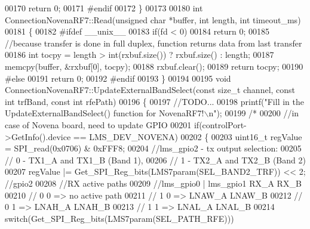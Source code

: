 \begin{DoxyCode}
{{{{00170     \textcolor{keywordflow}{return} 0;
00171 \textcolor{preprocessor}{#endif}
00172 \}
00173 
00180 \textcolor{keywordtype}{int} ConnectionNovenaRF7::Read(\textcolor{keywordtype}{unsigned} \textcolor{keywordtype}{char} *buffer, \textcolor{keywordtype}{int} length, \textcolor{keywordtype}{int} timeout_ms)
00181 \{
00182 \textcolor{preprocessor}{#ifdef \_\_unix\_\_}
00183     \textcolor{keywordflow}{if}(fd < 0)
00184         \textcolor{keywordflow}{return} 0;
00185     \textcolor{comment}{//because transfer is done in full duplex, function returns data from last transfer}
00186     \textcolor{keywordtype}{int} tocpy = length > int(rxbuf.size()) ? rxbuf.size() : length;
00187     memcpy(buffer, &rxbuf[0], tocpy);
00188     rxbuf.clear();
00189     \textcolor{keywordflow}{return} tocpy;
00190 \textcolor{preprocessor}{#else}
00191     \textcolor{keywordflow}{return} 0;
00192 \textcolor{preprocessor}{#endif}
00193 \}
00194 
00195 \textcolor{keywordtype}{void} ConnectionNovenaRF7::UpdateExternalBandSelect(\textcolor{keyword}{const} \textcolor{keywordtype}{size\_t} channel, \textcolor{keyword}{const} \textcolor{keywordtype}{int} trfBand, \textcolor{keyword}{const} \textcolor{keywordtype}{int} 
      rfePath)
00196 \{
00197     \textcolor{comment}{//TODO...}
00198     printf(\textcolor{stringliteral}{"Fill in the UpdateExternalBandSelect() function for NovenaRF7!\(\backslash\)n"});
00199     \textcolor{comment}{/*}
00200 \textcolor{comment}{    //in case of Novena board, need to update GPIO}
00201 \textcolor{comment}{    if(controlPort->GetInfo().device == LMS\_DEV\_NOVENA)}
00202 \textcolor{comment}{    \{}
00203 \textcolor{comment}{        uint16\_t regValue = SPI\_read(0x0706) & 0xFFF8;}
00204 \textcolor{comment}{        //lms\_gpio2 - tx output selection:}
00205 \textcolor{comment}{        //      0 - TX1\_A and TX1\_B (Band 1),}
00206 \textcolor{comment}{        //      1 - TX2\_A and TX2\_B (Band 2)}
00207 \textcolor{comment}{        regValue |= Get\_SPI\_Reg\_bits(LMS7param(SEL\_BAND2\_TRF)) << 2; //gpio2}
00208 \textcolor{comment}{        //RX active paths}
00209 \textcolor{comment}{        //lms\_gpio0 | lms\_gpio1         RX\_A        RX\_B}
00210 \textcolor{comment}{        //  0           0       =>      no active path}
00211 \textcolor{comment}{        //  1           0       =>  LNAW\_A      LNAW\_B}
00212 \textcolor{comment}{        //  0           1       =>  LNAH\_A      LNAH\_B}
00213 \textcolor{comment}{        //  1           1       =>  LNAL\_A      LNAL\_B}
00214 \textcolor{comment}{        switch(Get\_SPI\_Reg\_bits(LMS7param(SEL\_PATH\_RFE)))}
}}}}
\end{DoxyCode}
